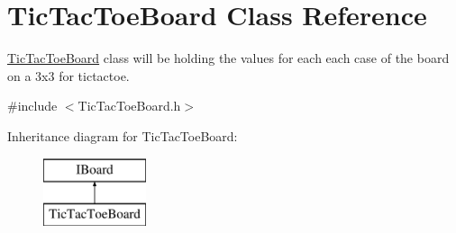 \hypertarget{class_tic_tac_toe_board}{}\section{Tic\+Tac\+Toe\+Board Class Reference}
\label{class_tic_tac_toe_board}


\hyperlink{class_tic_tac_toe_board}{Tic\+Tac\+Toe\+Board} class will be holding the values for each each case of the board on a 3x3 for tictactoe.  




{\ttfamily \#include $<$Tic\+Tac\+Toe\+Board.\+h$>$}

Inheritance diagram for Tic\+Tac\+Toe\+Board\+:\begin{figure}[H]
\begin{center}
\leavevmode
\includegraphics[height=2.000000cm]{class_tic_tac_toe_board}
\end{center}
\end{figure}
